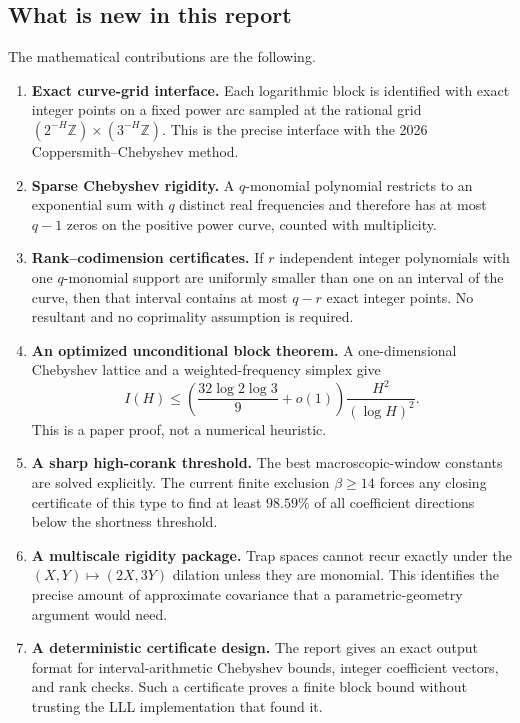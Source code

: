 \documentclass[11pt,oneside]{article}
\theoremstyle{definition}
\theoremstyle{remark}
\newcommand{\Z}{\mathbb Z}
\begin{document}
\subsection{What is new in this report}

The mathematical contributions are the following.

\begin{enumerate}
\item \textbf{Exact curve-grid interface.}  Each logarithmic block is identified with exact
integer points on a fixed power arc sampled at the rational grid $(2^{-H}\Z)\times(3^{-H}\Z)$.
This is the precise interface with the 2026 Coppersmith--Chebyshev method.

\item \textbf{Sparse Chebyshev rigidity.}  A $q$-monomial polynomial restricts to an
exponential sum with $q$ distinct real frequencies and therefore has at most $q-1$ zeros on
the positive power curve, counted with multiplicity.

\item \textbf{Rank--codimension certificates.}  If $r$ independent integer polynomials with
one $q$-monomial support are uniformly smaller than one on an interval of the curve, then that
interval contains at most $q-r$ exact integer points.  No resultant and no coprimality
assumption is required.

\item \textbf{An optimized unconditional block theorem.}  A one-dimensional Chebyshev lattice
and a weighted-frequency simplex give
\[
 I(H)\le\left(\frac{32\log2\log3}{9}+o(1)\right)\frac{H^2}{(\log H)^2}.
\]
This is a paper proof, not a numerical heuristic.

\item \textbf{A sharp high-corank threshold.}  The best macroscopic-window constants are
solved explicitly.  The current finite exclusion $\beta\ge14$ forces any closing certificate
of this type to find at least $98.59\%$ of all coefficient directions below the shortness
threshold.

\item \textbf{A multiscale rigidity package.}  Trap spaces cannot recur exactly under the
$(X,Y)\mapsto(2X,3Y)$ dilation unless they are monomial.  This identifies the precise amount
of approximate covariance that a parametric-geometry argument would need.

\item \textbf{A deterministic certificate design.}  The report gives an exact output format
for interval-arithmetic Chebyshev bounds, integer coefficient vectors, and rank checks.  Such a
certificate proves a finite block bound without trusting the LLL implementation that found it.
\end{enumerate}
\end{document}
